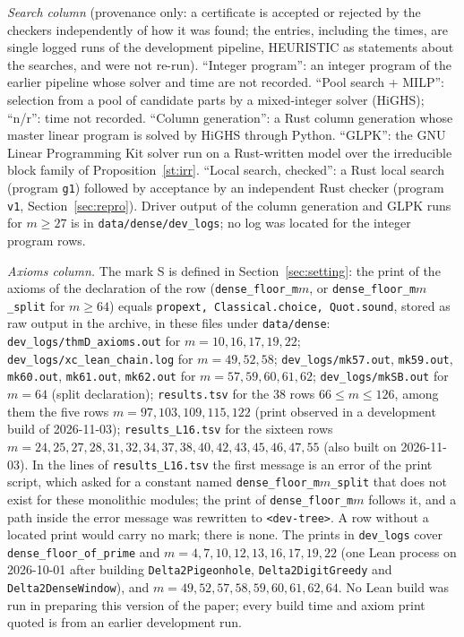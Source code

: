 \documentclass[11pt]{article}
\theoremstyle{remark}
\begin{document}
\emph{Search column} (provenance only: a certificate is accepted or rejected by the checkers independently of how it was found; the entries, including the times, are single logged runs of the development pipeline, HEURISTIC as statements about the searches, and were not re-run). ``Integer program'': an integer program of the earlier pipeline whose solver and time are not recorded. ``Pool search + MILP'': selection from a pool of candidate parts by a mixed-integer solver (HiGHS); ``n/r'': time not recorded. ``Column generation'': a Rust column generation whose master linear program is solved by HiGHS through Python. ``GLPK'': the GNU Linear Programming Kit solver run on a Rust-written model over the irreducible block family of Proposition~\ref{st:irr}. ``Local search, checked'': a Rust local search (program \texttt{g1}) followed by acceptance by an independent Rust checker (program \texttt{v1}, Section~\ref{sec:repro}). Driver output of the column generation and GLPK runs for $m\ge27$ is in \texttt{data/dense/dev\_logs}; no log was located for the integer program rows.

\emph{Axioms column.} The mark S is defined in Section~\ref{sec:setting}: the print of the axioms of the declaration of the row (\texttt{dense\_floor\_m$m$}, or \texttt{dense\_floor\_m$m$\_split} for $m\ge64$) equals \texttt{propext, Classical.choice, Quot.sound}, stored as raw output in the archive, in these files under \texttt{data\slash dense}: \texttt{dev\_logs\slash thmD\_axioms.out} for $m=10,16,17,19,22$; \texttt{dev\_logs\slash xc\_lean\_chain.log} for $m=49,52,58$; \texttt{dev\_logs\slash mk57.out}, \texttt{mk59.out}, \texttt{mk60.out}, \texttt{mk61.out}, \texttt{mk62.out} for $m=57,59,60,61,62$; \texttt{dev\_logs\slash mkSB.out} for $m=64$ (split declaration); \texttt{results.tsv} for the $38$ rows $66\le m\le126$, among them the five rows $m=97,103,109,115,122$ (print observed in a development build of 2026-11-03); \texttt{results\_L16.tsv} for the sixteen rows $m=24,25,27,28,31,32,34,37,38,40,42,43,45,46,47,55$ (also built on 2026-11-03). In the lines of \texttt{results\_L16.tsv} the first message is an error of the print script, which asked for a constant named \texttt{dense\_floor\_m$m$\_split} that does not exist for these monolithic modules; the print of \texttt{dense\_floor\_m$m$} follows it, and a path inside the error message was rewritten to \texttt{<dev-tree>}. A row without a located print would carry no mark; there is none. The prints in \texttt{dev\_logs} cover \texttt{dense\_floor\_of\_prime} and $m=4,7,10,12,13,16,17,19,22$ (one Lean process on 2026-10-01 after building \texttt{Delta2Pigeonhole}, \texttt{Delta2DigitGreedy} and \texttt{Delta2DenseWindow}), and $m=49,52,57,58,59,60,61,62,64$. No Lean build was run in preparing this version of the paper; every build time and axiom print quoted is from an earlier development run.
\end{document}
